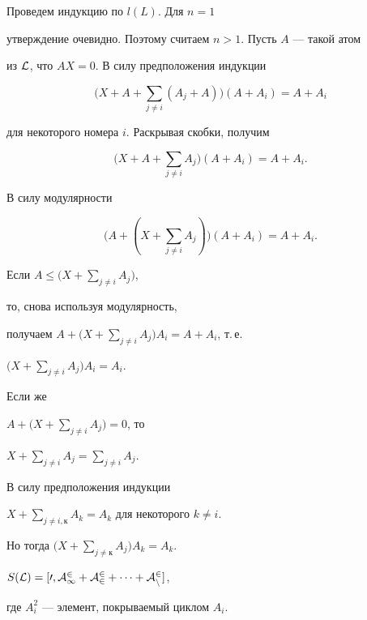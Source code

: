 \begin{pf}


Проведем индукцию по $l( L)$. Для $n = 1$


утверждение очевидно. Поэтому считаем $n>1$. Пусть $A$ --- такой атом


из $\cal L$, что $AX = 0$. В силу предположения индукции


$$


\bigg(X+A+\sum\limits_{j \ne i}(A_j+A)\bigg)(A+A_i)=A+A_i


$$


для некоторого номера $i$. Раскрывая скобки, получим


$$


\bigg(X+A+\sum\limits_{j \ne i}A_j\bigg)(A+A_i)=A+A_i.


$$


В силу модулярности


$$


\bigg(A+(X+\sum\limits_{j \ne i}A_j)\bigg)(A+A_i)=A+A_i.


$$


Если $A \leq \Big(X+\sum\limits_{j \ne i}A_j\Big)$,


то, снова используя модулярность,


получаем $A+\Big(X+\sum\limits_{j \ne i}A_j\Big)A_i=A+A_i$, т.\,е.


$\Big(X+\sum\limits_{j \ne i}A_j\Big)A_i=A_i$.


Если же


$A+\Big(X+\sum\limits_{j \ne i}A_j\Big)=0$, то


$X+\sum\limits_{j \ne i}A_j=\sum\limits_{j \ne i}A_j$.


В силу предположения индукции


$X+\sum\limits_{j \ne i,к}A_k=A_k$ для некоторого $k \ne i$.


Но тогда $\Big(X+\sum\limits_{j \ne к}A_j\Big)A_k=A_k$.


\end{pf}





\begin{cornonum}


$S(\cal L) = [0,A_1^2+A_2^2+\dotsb+A_n^2]$,


где $A_i^2$ --- элемент, покрываемый циклом $A_i$.


\end{cornonum}





